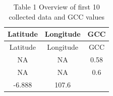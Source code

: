 \documentclass[]{elsarticle} %
\begin{document}
\begin{longtable}[]{@{}ccc@{}}
\caption{Table 1 Overview of first 10 collected data and GCC
values}\tabularnewline
\toprule
\begin{minipage}[b]{0.14\columnwidth}\centering\strut
Latitude\strut
\end{minipage} & \begin{minipage}[b]{0.15\columnwidth}\centering\strut
Longitude\strut
\end{minipage} & \begin{minipage}[b]{0.08\columnwidth}\centering\strut
GCC\strut
\end{minipage}\tabularnewline
\midrule
\endfirsthead
\toprule
\begin{minipage}[b]{0.14\columnwidth}\centering\strut
Latitude\strut
\end{minipage} & \begin{minipage}[b]{0.15\columnwidth}\centering\strut
Longitude\strut
\end{minipage} & \begin{minipage}[b]{0.08\columnwidth}\centering\strut
GCC\strut
\end{minipage}\tabularnewline
\midrule
\endhead
\begin{minipage}[t]{0.14\columnwidth}\centering\strut
NA\strut
\end{minipage} & \begin{minipage}[t]{0.15\columnwidth}\centering\strut
NA\strut
\end{minipage} & \begin{minipage}[t]{0.08\columnwidth}\centering\strut
0.58\strut
\end{minipage}\tabularnewline
\begin{minipage}[t]{0.14\columnwidth}\centering\strut
NA\strut
\end{minipage} & \begin{minipage}[t]{0.15\columnwidth}\centering\strut
NA\strut
\end{minipage} & \begin{minipage}[t]{0.08\columnwidth}\centering\strut
0.6\strut
\end{minipage}\tabularnewline
\begin{minipage}[t]{0.14\columnwidth}\centering\strut
-6.888\strut
\end{minipage} & \begin{minipage}[t]{0.15\columnwidth}\centering\strut
107.6\strut
\end{minipage} & \begin{minipage}[t]{0.08\columnwidth}\centering\strut

\end{minipage}
\end{longtable}
\end{document}
